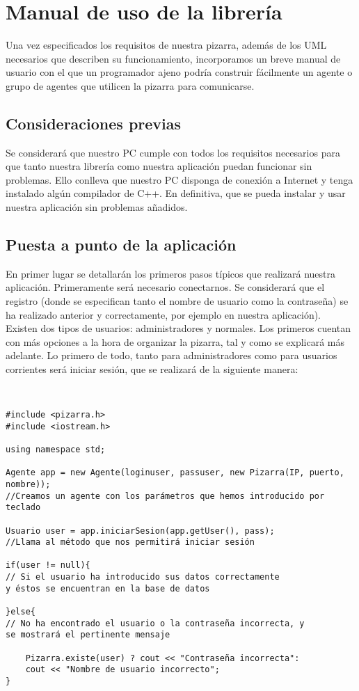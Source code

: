\chapter{Manual de uso de la librería}
Una vez especificados los requisitos de nuestra pizarra, además de los UML necesarios que describen su funcionamiento, incorporamos un breve manual de usuario con el que un programador ajeno podría construir fácilmente un agente o grupo de agentes que utilicen la pizarra para comunicarse.
\section{Consideraciones previas}
Se considerará que nuestro PC cumple con todos los requisitos necesarios para que tanto nuestra librería como nuestra aplicación puedan funcionar sin problemas. Ello conlleva que nuestro PC disponga de conexión a Internet y tenga instalado algún compilador de C++. En definitiva, que se pueda instalar y usar nuestra aplicación sin problemas añadidos.

\section{Puesta a punto de la aplicación} \label{sec:puesta}
En primer lugar se detallarán los primeros pasos típicos que realizará nuestra aplicación. Primeramente será necesario conectarnos. Se considerará que el registro (donde se especifican tanto el nombre de usuario como la contraseña) se ha realizado anterior y correctamente, por ejemplo en nuestra aplicación).\\

Existen dos tipos de usuarios: administradores y normales. Los primeros cuentan con más opciones a la hora de organizar la pizarra, tal y como se explicará más adelante. Lo primero de todo, tanto para administradores como para usuarios corrientes será iniciar sesión, que se realizará de la siguiente manera:
\begin{verbatim}


#include <pizarra.h>
#include <iostream.h>

using namespace std;

Agente app = new Agente(loginuser, passuser, new Pizarra(IP, puerto, nombre)); 
//Creamos un agente con los parámetros que hemos introducido por teclado

Usuario user = app.iniciarSesion(app.getUser(), pass); 
//Llama al método que nos permitirá iniciar sesión

if(user != null){ 
// Si el usuario ha introducido sus datos correctamente 
y éstos se encuentran en la base de datos

}else{            
// No ha encontrado el usuario o la contraseña incorrecta, y 
se mostrará el pertinente mensaje 

    Pizarra.existe(user) ? cout << "Contraseña incorrecta":
    cout << "Nombre de usuario incorrecto";
}
\end{verbatim}


